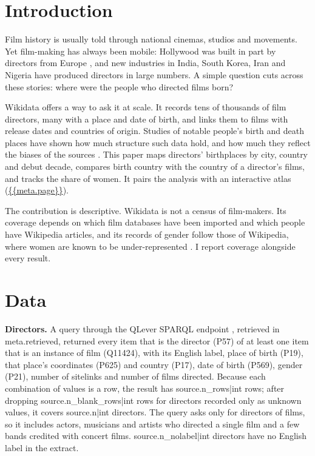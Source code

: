 \documentclass[11pt,a4paper]{article}
\begin{document}
\section{Introduction}
Film history is usually told through national cinemas, studios and movements. Yet film-making has always been mobile: Hollywood was built in part by directors from Europe \citep{petrie}, and new industries in India, South Korea, Iran and Nigeria \citep{haynes} have produced directors in large numbers. A simple question cuts across these stories: where were the people who directed films born?

Wikidata \citep{wikidata} offers a way to ask it at scale. It records tens of thousands of film directors, many with a place and date of birth, and links them to films with release dates and countries of origin. Studies of notable people's birth and death places have shown how much structure such data hold, and how much they reflect the biases of the sources \citep{schich}. This paper maps directors' birthplaces by city, country and debut decade, compares birth country with the country of a director's films, and tracks the share of women. It pairs the analysis with an interactive atlas (\url{{{meta.page}}}).

The contribution is descriptive. Wikidata is not a census of film-makers. Its coverage depends on which film databases have been imported and which people have Wikipedia articles, and its records of gender follow those of Wikipedia, where women are known to be under-represented \citep{wagner}. I report coverage alongside every result.

\section{Data}
\textbf{Directors.} A query through the QLever SPARQL endpoint \citep{qlever}, retrieved in {{meta.retrieved}}, returned every item that is the director (P57) of at least one item that is an instance of film (Q11424), with its English label, place of birth (P19), that place's coordinates (P625) and country (P17), date of birth (P569), gender (P21), number of sitelinks and number of films directed. Because each combination of values is a row, the result has {{source.n_rows|int}} rows; after dropping {{source.n_blank_rows|int}} rows for directors recorded only as unknown values, it covers {{source.n|int}} directors. The query asks only for directors of films, so it includes actors, musicians and artists who directed a single film and a few bands credited with concert films. {{source.n_nolabel|int}} directors have no English label in the extract.
\end{document}
